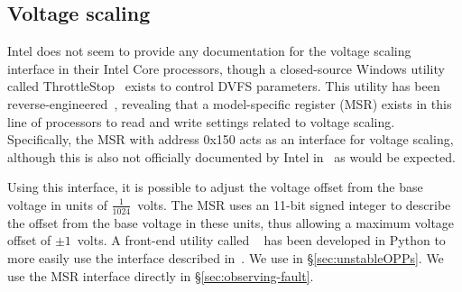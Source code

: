 \subsection{Voltage scaling}
\label{sec:undervolt}

Intel does not seem to provide any documentation for the voltage
scaling interface in their Intel Core processors, though a closed-source
Windows utility called ThrottleStop~\cite{throttlestop} exists to control DVFS
parameters. This utility has been reverse-engineered~\cite{elersicDoc},
revealing that a model-specific register (MSR) exists in this line of processors
to read and write settings related to voltage scaling. Specifically, the MSR
with address 0x150 acts as an interface for voltage scaling, although this is
also not officially documented by Intel in~\cite[Vol. 4, §2.13]{intelDevManual}
as would be expected.

Using this interface, it is possible to adjust the voltage offset from the base
voltage in units of $\frac{1}{1024}$~volts. The MSR uses an 11-bit signed 
integer to describe the offset from the base voltage in these units, thus
allowing a maximum voltage offset of $\pm{1}$~volts. A front-end utility called
~\cite{whewellUndervolt} has been developed in Python to more
easily use the interface described in~\cite{elersicDoc}. We use 
in §\ref{sec:unstableOPPs}. We use the MSR interface directly in §\ref{sec:observing-fault}.
